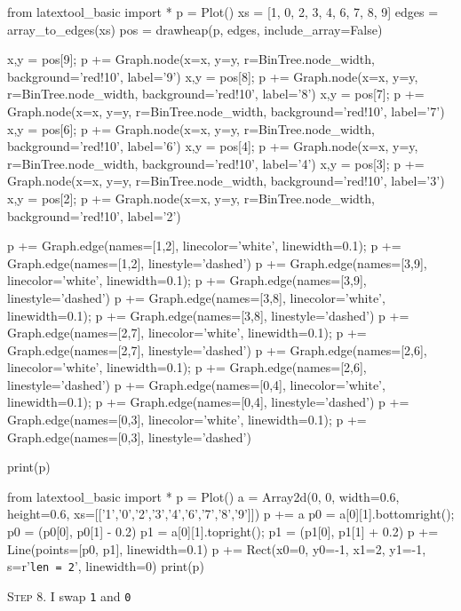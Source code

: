 \begin{python}
from latextool_basic import *
p = Plot()
xs = [1, 0, 2, 3, 4, 6, 7, 8, 9]
edges = array_to_edges(xs)
pos = drawheap(p, edges, include_array=False)

x,y = pos[9]; p += Graph.node(x=x, y=y, r=BinTree.node_width, background='red!10', label='9')
x,y = pos[8]; p += Graph.node(x=x, y=y, r=BinTree.node_width, background='red!10', label='8')
x,y = pos[7]; p += Graph.node(x=x, y=y, r=BinTree.node_width, background='red!10', label='7')
x,y = pos[6]; p += Graph.node(x=x, y=y, r=BinTree.node_width, background='red!10', label='6')
x,y = pos[4]; p += Graph.node(x=x, y=y, r=BinTree.node_width, background='red!10', label='4')
x,y = pos[3]; p += Graph.node(x=x, y=y, r=BinTree.node_width, background='red!10', label='3')
x,y = pos[2]; p += Graph.node(x=x, y=y, r=BinTree.node_width, background='red!10', label='2')

p += Graph.edge(names=[1,2], linecolor='white', linewidth=0.1); p += Graph.edge(names=[1,2], linestyle='dashed')
p += Graph.edge(names=[3,9], linecolor='white', linewidth=0.1); p += Graph.edge(names=[3,9], linestyle='dashed')
p += Graph.edge(names=[3,8], linecolor='white', linewidth=0.1); p += Graph.edge(names=[3,8], linestyle='dashed')
p += Graph.edge(names=[2,7], linecolor='white', linewidth=0.1); p += Graph.edge(names=[2,7], linestyle='dashed')
p += Graph.edge(names=[2,6], linecolor='white', linewidth=0.1); p += Graph.edge(names=[2,6], linestyle='dashed')
p += Graph.edge(names=[0,4], linecolor='white', linewidth=0.1); p += Graph.edge(names=[0,4], linestyle='dashed')
p += Graph.edge(names=[0,3], linecolor='white', linewidth=0.1); p += Graph.edge(names=[0,3], linestyle='dashed')

print(p)
\end{python}
\begin{python}
from latextool_basic import *
p = Plot()
a = Array2d(0, 0, width=0.6, height=0.6, 
             xs=[['1','0','2','3','4','6','7','8','9']])
p += a
p0 = a[0][1].bottomright(); p0 = (p0[0], p0[1] - 0.2)
p1 = a[0][1].topright(); p1 = (p1[0], p1[1] + 0.2)
p += Line(points=[p0, p1], linewidth=0.1)
p += Rect(x0=0, y0=-1, x1=2, y1=-1, s=r'\texttt{len = 2}', linewidth=0) 
print(p)
\end{python}


\textsc{Step 8}.
I swap \texttt{1} and \texttt{0}

